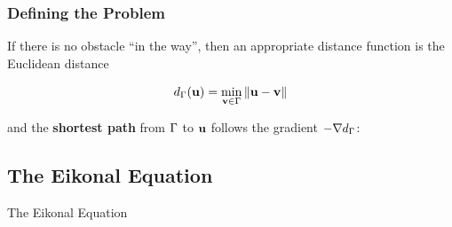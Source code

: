 \documentclass[aspectratio=169,handout]{beamer}
\begin{document}
\begin{frame}
	\frametitle{Defining the Problem}
	If there is no obstacle ``in the way'', then an appropriate distance function is the Euclidean distance
	
	$$d_{\Gamma}(\mathbf{u}) = \min_{\mathbf{v} \in \Gamma} \Vert \mathbf{u} - \mathbf{v}\Vert$$
	
	and the \textbf{shortest path} from $\Gamma$ to $\mathbf{u}$ follows the gradient $-\nabla d_{\Gamma}$:
	\begin{figure}
		\hfill
	\end{figure}
\end{frame}

\subsection{The Eikonal Equation}
\begin{frame}[plain]
	\begin{center}
		{\color{myblue} \huge The Eikonal Equation}
	\end{center}
\end{frame}
\end{document}
